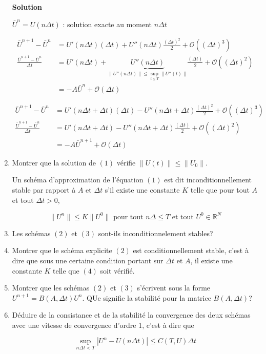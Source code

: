 \documentclass[10pt,a4paper,oneside]{article}
\newenvironment{exercice}[1][Exercice]{\begin{trivlist}
\item[\hskip \labelsep {\bfseries #1}]}{\end{trivlist}}
\begin{document}
\begin{exercice}{1}
\begin{enumerate}
\textbf{Solution}

$\bar{U}^n = U(n \Delta t)$ : solution exacte au moment $n \Delta t$

\begin{align*}
\bar{U}^{n + 1} - \bar{U}^n &= U'(n \Delta t) (\Delta t) + U''(n \Delta t)\frac{(\Delta t)^2}{2}  + \mathcal{O} ((\Delta t)^3) \\
\frac{\bar{U}^{n + 1} - \bar{U}^n}{\Delta t} &= U'(n \Delta t) + \underbrace{U''(n \Delta t)}_{\| U''(n \Delta t) \| \leq \sup_{t \leq T} \| U''(t) \|}\frac{(\Delta t)}{2} + \mathcal{O} ((\Delta t)^2) \\
&= -A \bar{U}^n + \mathcal{O}(\Delta t)
\end{align*}

\begin{align*}
\bar{U}^{n + 1} - \bar{U}^n &= U'(n \Delta t + \Delta t) (\Delta t) - U''(n \Delta t + \Delta t)\frac{(\Delta t)^2}{2}  + \mathcal{O} ((\Delta t)^3) \\
\frac{\bar{U}^{n + 1} - \bar{U}^n}{\Delta t} &= U'(n \Delta t + \Delta t) - U''(n \Delta t + \Delta t)\frac{(\Delta t)}{2} + \mathcal{O} ((\Delta t)^2) \\
&= -A \bar{U}^{n + 1} + \mathcal{O}(\Delta t)
\end{align*}

\item
Montrer que la solution de $(1)$ vérifie $\| U(t) \| \leq \| U_0 \|$.

Un schéma d'approximation de l'équation $(1)$ est dit inconditionnellement stable par rapport à $A$ et $\Delta t$ s'il existe une constante $K$ telle que pour tout $A$ et tout $\Delta t > 0$,

\begin{equation}
\| U^n \| \leq K \| U^0 \| \text{ pour tout } n\Delta \leq T \text{ et tout } U^0 \in \mathbb{R}^N
\end{equation}

\item
Les schémas $(2)$ et $(3)$ sont-ils inconditionnelement stables?

\item
Montrer que le schéma explicite $(2)$ est conditionnellement stable, c'est à dire que sous une certaine condition portant sur $\Delta t$ et $A$, il existe une constante $K$ telle que $(4)$ soit vérifié.

\item
Montrer que les schémas $(2)$ et $(3)$ s'écrivent sous la forme $U^{n + 1} = B(A, \Delta t)U^n$. QUe signifie la stabilité pour la matrice $B(A, \Delta t)$?

\item
Déduire de la consistance et de la stabilité la convergence des deux schémas avec une vitesse de convergence d'ordre 1, c'est à dire que

\[ \sup_{n \Delta t < T} |U^n - U(n \Delta t)| \leq C(T,U) \Delta t \]
\end{enumerate}

\end{exercice}
\end{document}
